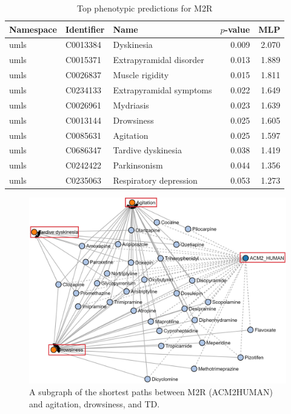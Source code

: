 \begin{table}[!ht]
    \centering
    \begin{tabular}{ |l|l|l|r|r| }
        \hline
        \textbf{Namespace} & \textbf{Identifier} & \textbf{Name} & \textbf{$p$-value} & \textbf{MLP} \\
        \hline
        umls & C0013384 & Dyskinesia & 0.009 & 2.070 \\
        \hline
        umls & C0015371 & Extrapyramidal disorder & 0.013 & 1.889 \\
        \hline
        umls & C0026837 & Muscle rigidity & 0.015 & 1.811 \\
        \hline
        umls & C0234133 & Extrapyramidal symptoms & 0.022 & 1.649 \\
        \hline
        umls & C0026961 & Mydriasis & 0.023 & 1.639 \\
        \hline
        umls & C0013144 & Drowsiness & 0.025 & 1.605 \\
        \hline
        umls & C0085631 & Agitation & 0.025 & 1.597 \\
        \hline
        umls & C0686347 & Tardive dyskinesia & 0.038 & 1.419 \\
        \hline
        umls & C0242422 & Parkinsonism & 0.044 & 1.356 \\
        \hline
        umls & C0235063 & Respiratory depression & 0.053 & 1.273 \\
        \hline
    \end{tabular}
    \captionsetup{justification=centering}
    \caption{Top phenotypic predictions for M2R}
    \label{tab:target_phenotype}
\end{table}

\begin{figure}[!ht]
    \centering
    \includegraphics[scale=0.6]
    {figures/chrm2_phenotypes.jpg}
    \caption[The shortest paths between M2R, agitation, drowsiness, and tardive dyskinesia]{\label{fig:chrm2_phenotypes} A subgraph of the shortest paths between M2R (ACM2\textunderscore HUMAN) and agitation, drowsiness, and \ac{TD}.}
\end{figure}


